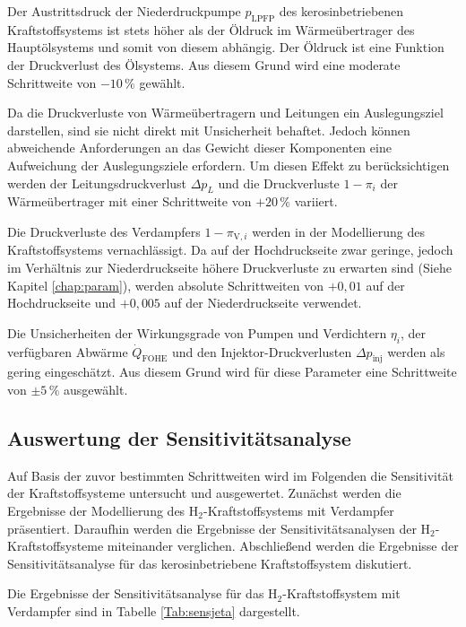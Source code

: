 Der Austrittsdruck der Niederdruckpumpe $p_\mathrm{LPFP}$ des kerosinbetriebenen Kraftstoffsystems ist stets höher als der Öldruck im Wärmeübertrager des Hauptölsystems und somit von diesem abhängig. Der Öldruck ist eine Funktion der Druckverlust des Ölsystems. Aus diesem Grund wird eine moderate Schrittweite von $-10\,\%$ gewählt.

Da die Druckverluste von Wärmeübertragern und Leitungen ein Auslegungsziel darstellen, sind sie nicht direkt mit Unsicherheit behaftet. Jedoch können abweichende Anforderungen an das Gewicht dieser Komponenten eine Aufweichung der Auslegungsziele erfordern. Um diesen Effekt zu berücksichtigen werden der Leitungsdruckverlust $\Delta p_L$ und die Druckverluste $1-\pi_i$ der Wärmeübertrager mit einer Schrittweite von $+20\,\%$ variiert. 

Die Druckverluste des Verdampfers $1-\pi_{\mathrm{V}, i}$ werden in der Modellierung des Kraftstoffsystems vernachlässigt. Da auf der Hochdruckseite zwar geringe, jedoch im Verhältnis zur Niederdruckseite höhere Druckverluste zu erwarten sind (Siehe Kapitel \ref{chap:param}), werden absolute Schrittweiten von $+0,01$ auf der Hochdruckseite und $+0,005$ auf der Niederdruckseite verwendet. 

Die Unsicherheiten der Wirkungsgrade von Pumpen und Verdichtern $\eta_i$, der verfügbaren Abwärme $\dot{Q}_\mathrm{FOHE}$  und den Injektor-Druckverlusten $\Delta p_\mathrm{inj}$ werden als gering eingeschätzt. Aus diesem Grund wird für diese Parameter eine Schrittweite von $\pm 5\,\%$ ausgewählt.

\subsection{Auswertung der Sensitivitätsanalyse}

Auf Basis der zuvor bestimmten Schrittweiten wird im Folgenden die Sensitivität der Kraftstoffsysteme untersucht und ausgewertet. Zunächst werden die Ergebnisse der Modellierung des H$_2$-Kraftstoffsystems mit Verdampfer präsentiert. Daraufhin werden die Ergebnisse der Sensitivitätsanalysen der H$_2$-Kraftstoffsysteme miteinander verglichen. Abschließend werden die Ergebnisse der Sensitivitätsanalyse für das kerosinbetriebene Kraftstoffsystem diskutiert.

Die Ergebnisse der Sensitivitätsanalyse für das H$_2$-Kraftstoffsystem mit Verdampfer sind in Tabelle \ref{Tab:sensjeta} dargestellt.

